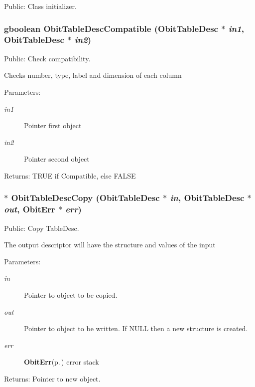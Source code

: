 Public: Class initializer. 

\subsubsection{\setlength{\rightskip}{0pt plus 5cm}gboolean Obit\-Table\-Desc\-Compatible ({\bf Obit\-Table\-Desc} $\ast$ {\em in1}, {\bf Obit\-Table\-Desc} $\ast$ {\em in2})}\label{ObitTableDesc_8h_a14}


Public: Check compatibility. 

Checks number, type, label and dimension of each column \begin{Desc}
\item[Parameters:]
\begin{description}
\item[{\em in1}]Pointer first object \item[{\em in2}]Pointer second object \end{description}
\end{Desc}
\begin{Desc}
\item[Returns:]TRUE if Compatible, else FALSE \end{Desc}
\subsubsection{$\ast$ Obit\-Table\-Desc\-Copy ({\bf Obit\-Table\-Desc} $\ast$ {\em in}, {\bf Obit\-Table\-Desc} $\ast$ {\em out}, {\bf Obit\-Err} $\ast$ {\em err})}\label{ObitTableDesc_8h_a9}


Public: Copy Table\-Desc. 

The output descriptor will have the structure and values of the input \begin{Desc}
\item[Parameters:]
\begin{description}
\item[{\em in}]Pointer to object to be copied. \item[{\em out}]Pointer to object to be written. If NULL then a new structure is created. \item[{\em err}]{\bf Obit\-Err}{\rm (p.\,\pageref{structObitErr})} error stack \end{description}
\end{Desc}
\begin{Desc}
\item[Returns:]Pointer to new object. \end{Desc}
